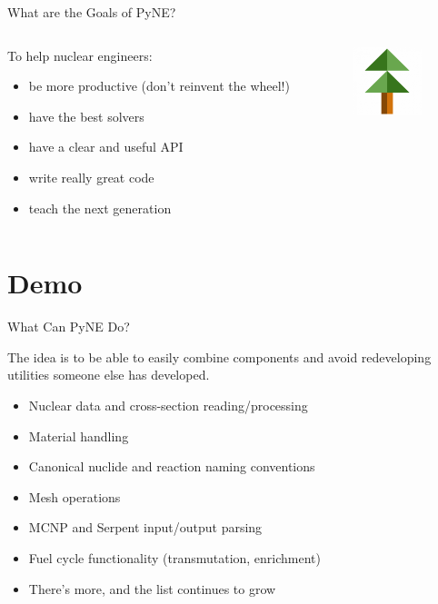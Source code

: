 \documentclass[xcolor=x11names,compress]{beamer}
\renewcommand{\(}{\begin{columns}}
\renewcommand{\)}{\end{columns}}
\newcommand{\<}[1]{\begin{column}{#1}}
\renewcommand{\>}{\end{column}}
\begin{document}
\begin{frame}{What are the Goals of PyNE?}

    \begin{columns}
    \begin{column}{0.45\textwidth}
        To help nuclear engineers:
        \begin{itemize}
        \item be more \alert{productive} (don't reinvent the wheel!)
        \item have the \alert{best solvers}
        \item have a \alert{clear and useful API}
        \item write really \alert{great code}
        \item \alert{teach} the next generation
        \end{itemize}
  	\end{column}
 	\begin{column}{0.45\textwidth}
 	   \begin{center}
 	   \begin{figure}
       \includegraphics[height=2cm]{../figs/pyne-icon-big}
	   \end{figure}
 	   \end{center}
  	\end{column}
	\end{columns}

\end{frame}

\section{Demo}
\begin{frame}{What Can PyNE Do?}

    The idea is to be able to easily combine components and avoid redeveloping
    utilities someone else has developed.

    \begin{itemize}
    \item Nuclear data and cross-section reading/processing
    \item Material handling
    \item Canonical nuclide and reaction naming conventions
    \item Mesh operations
    \item MCNP and Serpent input/output parsing
    \item Fuel cycle functionality (transmutation, enrichment)
    \item There's more, and the list continues to grow
    \end{itemize}
    
\end{frame}
\end{document}
